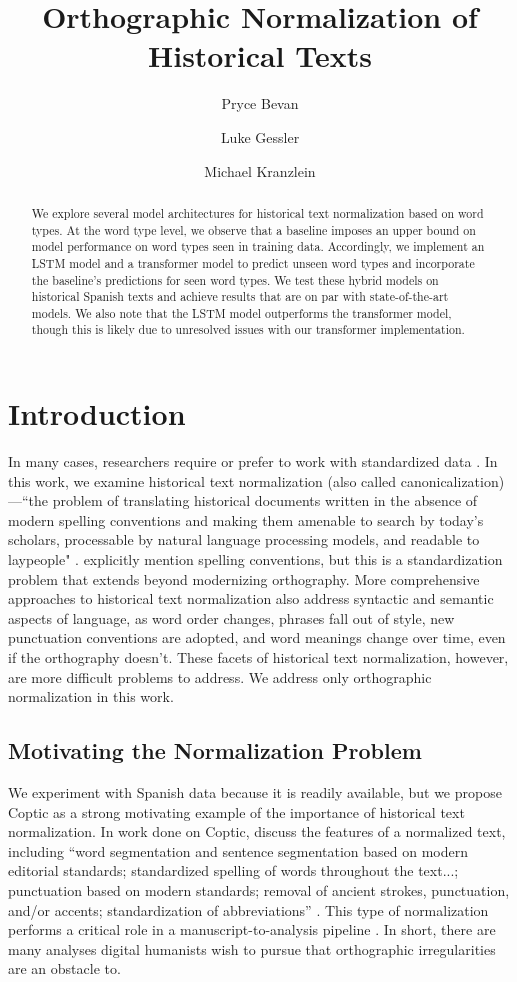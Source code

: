 \documentclass[11pt,a4paper]{article}
\title{Orthographic Normalization of Historical Texts}
\author[1]{Pryce Bevan}
\author[2]{Luke Gessler}
\author[1]{Michael Kranzlein}
\affil[1]{Georgetown University\\ Department of Computer Science}
\affil[2]{Georgetown University\\ Department of Linguistics}
\affil[ ]{\{\tt pwb8, lg876, mmk119\}@georgetown.edu}
\date{}
\begin{document}
\maketitle

\begin{abstract}
We explore several model architectures for historical text normalization based on word types. At the word type level, we observe that a baseline imposes an upper bound on model performance on word types seen in training data. Accordingly, we implement an LSTM model and a transformer model to predict unseen word types and incorporate the baseline's predictions for seen word types. We test these hybrid models on historical Spanish texts and achieve results that are on par with state-of-the-art models. We also note that the LSTM model outperforms the transformer model, though this is likely due to unresolved issues with our transformer implementation.
\end{abstract}

\section{Introduction}
In many cases, researchers require or prefer to work with standardized data \cite{piotrowski_natural_2012}. In this work, we examine historical text normalization (also called canonicalization)---``the problem of translating historical documents written in the absence of modern spelling conventions and making them amenable to search by today’s scholars, processable by natural language processing models, and readable to laypeople" \cite{bollmann_multi-task_2018}. \citeauthor{bollmann_multi-task_2018} explicitly mention spelling conventions, but this is a standardization problem that extends beyond modernizing orthography. More comprehensive approaches to historical text normalization also address syntactic and semantic aspects of language, as word order changes, phrases fall out of style, new punctuation conventions are adopted, and word meanings change over time, even if the orthography doesn't. These facets of historical text normalization, however, are more difficult problems to address. We address only orthographic normalization in this work.

\subsection{Motivating the Normalization Problem}
We experiment with Spanish data because it is readily available, but we propose Coptic as a strong motivating example of the importance of historical text normalization. In work done on Coptic, \citeauthor{schroeder_coptic_2013} discuss the features of a normalized text, including “word segmentation and sentence segmentation based on modern editorial standards; standardized spelling of words throughout the text...; punctuation based on modern standards; removal of ancient strokes, punctuation, and/or accents; standardization of abbreviations” \cite{schroeder_coptic_2013}. This type of normalization performs a critical role in a manuscript-to-analysis pipeline \cite{zeldes_nlp_2016}. In short, there are many analyses digital humanists wish to pursue that orthographic irregularities are an obstacle to.
\end{document}
